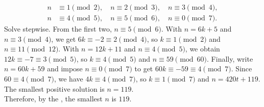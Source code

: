 \begin{enumerate}
\begin{subanswer}
  \begin{align*}
  n & \equiv 1 \pmod{2},\quad n \equiv 2 \pmod{3},\quad n \equiv 3 \pmod{4},\\
  n & \equiv 4 \pmod{5},\quad n \equiv 5 \pmod{6},\quad n \equiv 0 \pmod{7}.
  \end{align*}
  Solve stepwise. From the first two, $n\equiv 5\pmod{6}$. With $n=6k+5$ and $n\equiv 3\pmod{4}$, 
  we get $6k\equiv -2\equiv 2\pmod{4}$, so $k\equiv 1\pmod{2}$ and $n\equiv 11\pmod{12}$. 
  With $n=12k+11$ and $n\equiv 4\pmod{5}$, we obtain $12k\equiv -7\equiv 3\pmod{5}$, so 
  $k\equiv 4\pmod{5}$ and $n\equiv 59\pmod{60}$. Finally, write $n=60k+59$ and impose 
  $n\equiv 0\pmod{7}$ to get $60k\equiv -59\equiv 4\pmod{7}$. Since $60\equiv 4\pmod{7}$, 
  we have $4k\equiv 4\pmod{7}$, so $k\equiv 1\pmod{7}$ and $n=420t+119$. 
  The smallest positive solution is $n=119$.\vspace*{10px}\\
  Therefore, by the , the smallest $n$ is $119$.
\end{subanswer}







\end{enumerate}
